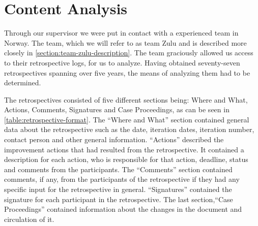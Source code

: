 \section{Content Analysis}
Through our supervisor we were put in contact with a experienced team in Norway. The team, which we will refer to as team Zulu and is described more closely in \autoref{section:team-zulu-description}. The team graciously allowed us access to their retrospective logs, for us to analyze.
Having obtained seventy-seven retrospectives spanning over five years, the means of analyzing them had to be determined. 

The retrospectives consisted of five different sections being: Where and What, Actions, Comments, Signatures and Case Proceedings, as can be seen in \autoref{table:retrospective-format}. 
The ``Where and What'' section contained general data about the retrospective such as the date, iteration dates, iteration number, contact person and other general information. ``Actions'' described the improvement actions that had resulted from the retrospective. It contained a description for each action, who is responsible for that action, deadline, status and comments from the participants. The ``Comments'' section contained comments, if any, from the participants of the retrospective if they had any specific input for the retrospective in general. ``Signatures'' contained the signature for each participant in the retrospective. The last section,``Case Proceedings'' contained information about the changes in the document and circulation of it.

\begin{table}[!h]
	\begin{center}
	\caption{The section of the retrospectives}
	\label{table:retrospective-format}
\end{center}
\end{table}

